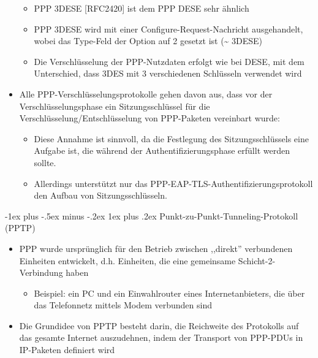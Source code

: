 \documentclass[a4paper]{article}
\makeatletter
\renewcommand{\subsubsection}{\@startsection{subsubsection}{3}{0mm}%
 {-1ex plus -.5ex minus -.2ex}%
 {1ex plus .2ex}%
 {\normalfont\small\bfseries}}
\makeatother
\begin{document}
\begin{multicols}{3}
\begin{itemize}
              \begin{itemize}
                  \item
                        PPP 3DESE {[}RFC2420{]} ist dem PPP DESE sehr ähnlich
                  \item
                        PPP 3DESE wird mit einer Configure-Request-Nachricht ausgehandelt,
                        wobei das Type-Feld der Option auf 2 gesetzt ist (\textasciitilde{}
                        3DESE)
                  \item
                        Die Verschlüsselung der PPP-Nutzdaten erfolgt wie bei DESE, mit dem
                        Unterschied, dass 3DES mit 3 verschiedenen Schlüsseln verwendet wird
              \end{itemize}
        \item
              Alle PPP-Verschlüsselungsprotokolle gehen davon aus, dass vor der
              Verschlüsselungsphase ein Sitzungsschlüssel für die
              Verschlüsselung/Entschlüsselung von PPP-Paketen vereinbart wurde:

              \begin{itemize}
                  \item
                        Diese Annahme ist sinnvoll, da die Festlegung des Sitzungsschlüssels
                        eine Aufgabe ist, die während der Authentifizierungsphase erfüllt
                        werden sollte.
                  \item
                        Allerdings unterstützt nur das
                        PPP-EAP-TLS-Authentifizierungsprotokoll den Aufbau von
                        Sitzungsschlüsseln.
              \end{itemize}
    \end{itemize}


    \subsubsection{Punkt-zu-Punkt-Tunneling-Protokoll
        (PPTP)}

    \begin{itemize}
        \item
              PPP wurde ursprünglich für den Betrieb zwischen ,,direkt'' verbundenen
              Einheiten entwickelt, d.h. Einheiten, die eine gemeinsame
              Schicht-2-Verbindung haben

              \begin{itemize}
                  \item
                        Beispiel: ein PC und ein Einwahlrouter eines Internetanbieters, die
                        über das Telefonnetz mittels Modem verbunden sind
              \end{itemize}
        \item
              Die Grundidee von PPTP besteht darin, die Reichweite des Protokolls
              auf das gesamte Internet auszudehnen, indem der Transport von PPP-PDUs
              in IP-Paketen definiert wird


\end{itemize}
\end{multicols}
\end{document}
